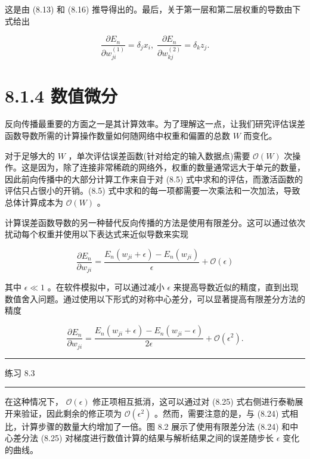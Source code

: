 \documentclass[10pt]{report}
\newcommand{\HRule}{\begin{center}\rule{0.9\linewidth}{0.2mm}\end{center}}
\begin{document}
这是由 (8.13) 和 (8.16) 推导得出的。最后，关于第一层和第二层权重的导数由下式给出

\[
\frac{\partial {E}_{n}}{\partial {w}_{ji}^{\left( 1\right) }} = {\delta }_{j}{x}_{i},\;\frac{\partial {E}_{n}}{\partial {w}_{kj}^{\left( 2\right) }} = {\delta }_{k}{z}_{j}. \tag{8.23}
\]

\section*{8.1.4 数值微分}

反向传播最重要的方面之一是其计算效率。为了理解这一点，让我们研究评估误差函数导数所需的计算操作数量如何随网络中权重和偏置的总数 \(W\) 而变化。

对于足够大的 \(W\) ，单次评估误差函数(针对给定的输入数据点)需要 \(\mathcal{O}\left( W\right)\) 次操作。这是因为，除了连接非常稀疏的网络外，权重的数量通常远大于单元的数量，因此前向传播中的大部分计算工作来自于对 (8.5) 式中求和的评估，而激活函数的评估只占很小的开销。(8.5) 式中求和的每一项都需要一次乘法和一次加法，导致总体计算成本为 \(\mathcal{O}\left( W\right)\) 。

计算误差函数导数的另一种替代反向传播的方法是使用有限差分。这可以通过依次扰动每个权重并使用以下表达式来近似导数来实现

\[
\frac{\partial {E}_{n}}{\partial {w}_{ji}} = \frac{{E}_{n}\left( {{w}_{ji} + \epsilon }\right)  - {E}_{n}\left( {w}_{ji}\right) }{\epsilon } + \mathcal{O}\left( \epsilon \right)  \tag{8.24}
\]

其中 \(\epsilon  \ll  1\) 。在软件模拟中，可以通过减小 \(\epsilon\) 来提高导数近似的精度，直到出现数值舍入问题。通过使用以下形式的对称中心差分，可以显著提高有限差分方法的精度

\[
\frac{\partial {E}_{n}}{\partial {w}_{ji}} = \frac{{E}_{n}\left( {{w}_{ji} + \epsilon }\right)  - {E}_{n}\left( {{w}_{ji} - \epsilon }\right) }{2\epsilon } + \mathcal{O}\left( {\epsilon }^{2}\right) . \tag{8.25}
\]

\HRule

练习 8.3

\HRule

在这种情况下， \(\mathcal{O}\left( \epsilon \right)\) 修正项相互抵消，这可以通过对 (8.25) 式右侧进行泰勒展开来验证，因此剩余的修正项为 \(\mathcal{O}\left( {\epsilon }^{2}\right)\) 。然而，需要注意的是，与 (8.24) 式相比，计算步骤的数量大约增加了一倍。图 8.2 展示了使用有限差分法 (8.24) 和中心差分法 (8.25) 对梯度进行数值计算的结果与解析结果之间的误差随步长 \(\epsilon\) 变化的曲线。
\end{document}
